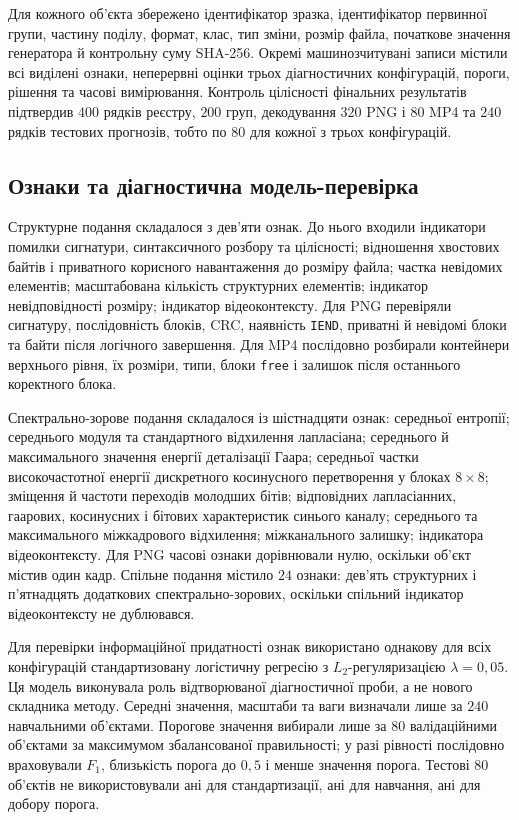Для кожного об'єкта збережено ідентифікатор зразка, ідентифікатор первинної групи, частину поділу, формат, клас, тип зміни, розмір файла, початкове значення генератора й контрольну суму SHA-256. Окремі машинозчитувані записи містили всі виділені ознаки, неперервні оцінки трьох діагностичних конфігурацій, пороги, рішення та часові вимірювання. Контроль цілісності фінальних результатів підтвердив $400$ рядків реєстру, $200$ груп, декодування $320$ PNG і $80$ MP4 та $240$ рядків тестових прогнозів, тобто по $80$ для кожної з трьох конфігурацій.

\subsection{Ознаки та діагностична модель-перевірка}
\label{subsec:ch4_ind_svs_probe}

Структурне подання складалося з дев'яти ознак. До нього входили індикатори помилки сигнатури, синтаксичного розбору та цілісності; відношення хвостових байтів і приватного корисного навантаження до розміру файла; частка невідомих елементів; масштабована кількість структурних елементів; індикатор невідповідності розміру; індикатор відеоконтексту. Для PNG перевіряли сигнатуру, послідовність блоків, CRC, наявність \texttt{IEND}, приватні й невідомі блоки та байти після логічного завершення. Для MP4 послідовно розбирали контейнери верхнього рівня, їх розміри, типи, блоки \texttt{free} і залишок після останнього коректного блока.

Спектрально-зорове подання складалося із шістнадцяти ознак: середньої ентропії; середнього модуля та стандартного відхилення лапласіана; середнього й максимального значення енергії деталізації Гаара; середньої частки високочастотної енергії дискретного косинусного перетворення у блоках $8\times8$; зміщення й частоти переходів молодших бітів; відповідних лапласіанних, гаарових, косинусних і бітових характеристик синього каналу; середнього та максимального міжкадрового відхилення; міжканального залишку; індикатора відеоконтексту. Для PNG часові ознаки дорівнювали нулю, оскільки об'єкт містив один кадр. Спільне подання містило $24$ ознаки: дев'ять структурних і п'ятнадцять додаткових спектрально-зорових, оскільки спільний індикатор відеоконтексту не дублювався.

Для перевірки інформаційної придатності ознак використано однакову для всіх конфігурацій стандартизовану логістичну регресію з $L_2$-регуляризацією $\lambda=0{,}05$. Ця модель виконувала роль відтворюваної діагностичної проби, а не нового складника методу. Середні значення, масштаби та ваги визначали лише за $240$ навчальними об'єктами. Порогове значення вибирали лише за $80$ валідаційними об'єктами за максимумом збалансованої правильності; у разі рівності послідовно враховували $F_1$, близькість порога до $0{,}5$ і менше значення порога. Тестові $80$ об'єктів не використовували ані для стандартизації, ані для навчання, ані для добору порога.


